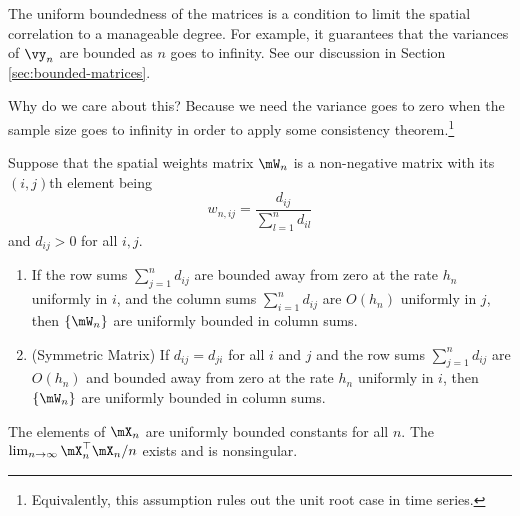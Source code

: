 \documentclass[english,12pt]{book}\usepackage[]{graphicx}\usepackage[]{xcolor}
\begin{document}
The uniform boundedness of the matrices is a condition to limit the spatial correlation to a manageable degree. For example, it guarantees that the variances of $\vy_n$ are bounded as $n$ goes to infinity. See our discussion in Section \ref{sec:bounded-matrices}.

Why do we care about this? Because we need the variance goes to zero when the sample size goes to infinity in order to apply some consistency theorem.\footnote{Equivalently, this assumption rules out the unit root case in time series.}


\begin{lemma}
  Suppose that the spatial weights matrix $\mW_n$ is a non-negative matrix with its $(i,j)$th element being 
  \begin{equation*}
    w_{n,ij} = \frac{d_{ij}}{\sum_{l = 1}^nd_{il}}
  \end{equation*}
  and $d_{ij}>0$ for all $i,j$.
  
  \begin{enumerate}
    \item If the row sums $\sum_{j = 1}^nd_{ij}$ are bounded away from zero at the rate $h_n$ uniformly in $i$, and the column sums $\sum_{i = 1}^nd_{ij}$ are $O(h_n)$ uniformly in $j$, then $\left\lbrace \mW_n \right\rbrace$  are uniformly bounded in column sums.
    \item (Symmetric Matrix) If $d_{ij} = d_{ji}$ for all $i$ and $j$ and the row sums $\sum_{j = 1}^nd_{ij}$ are $O(h_n)$ and bounded away from zero at the rate $h_n$ uniformly in $i$, then $\left\lbrace \mW_n \right\rbrace$  are uniformly bounded in column sums.
  \end{enumerate}
\end{lemma}


\begin{assumption}\label{assu:ml_6}
	The elements of $\mX_n$ are uniformly bounded constants for all $n$. The $\lim_{n\to \infty}\mX_n^\top\mX_n/n$ exists and is nonsingular. 
\end{assumption}
\end{document}
